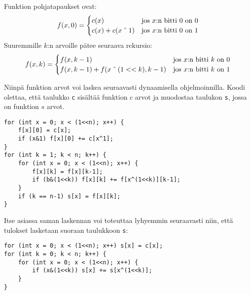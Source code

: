 Funktion pohjatapaukset ovat:
\begin{equation*}
    f(x,0) = \begin{cases}
               c(x)          & \textrm{jos $x$:n bitti 0 on 0}\\
               c(x)+c(x \XOR 1) & \textrm{jos $x$:n bitti 0 on 1}\\
           \end{cases}
\end{equation*}
Suuremmille $k$:n arvoille pätee seuraava rekursio:
\begin{equation*}
    f(x,k) = \begin{cases}
               f(x,k-1)          & \textrm{jos $x$:n bitti $k$ on 0}\\
               f(x,k-1)+f(x \XOR (1 < < k),k-1)    & \textrm{jos $x$:n bitti $k$ on 1}\\
           \end{cases}
\end{equation*}

Niinpä funktion arvot voi laskea seuraavasti
dynaamisella ohjelmoinnilla.
Koodi olettaa, että taulukko \texttt{c} sisältää
funktion $c$ arvot ja muodostaa taulukon \texttt{s},
jossa on funktion $s$ arvot.
\begin{lstlisting}
for (int x = 0; x < (1<<n); x++) {
    f[x][0] = c[x];
    if (x&1) f[x][0] += c[x^1];
}
for (int k = 1; k < n; k++) {
    for (int x = 0; x < (1<<n); x++) {
        f[x][k] = f[x][k-1];
        if (b&(1<<k)) f[x][k] += f[x^(1<<k)][k-1];
    }
    if (k == n-1) s[x] = f[x][k];
}
\end{lstlisting}

Itse asiassa saman laskennan voi toteuttaa lyhyemmin
seuraavasti niin, että tulokset lasketaan
suoraan taulukkoon \texttt{s}:
\begin{lstlisting}
for (int x = 0; x < (1<<n); x++) s[x] = c[x];
for (int k = 0; k < n; k++) {
    for (int x = 0; x < (1<<n); x++) {
        if (x&(1<<k)) s[x] += s[x^(1<<k)];
    }
}
\end{lstlisting}

